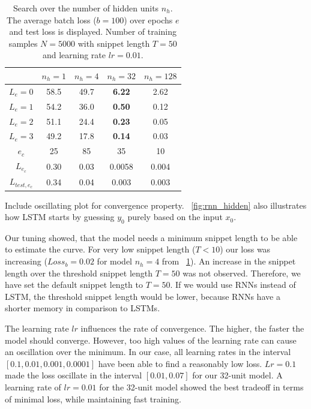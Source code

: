 \begin{table}[]
\centering
\begin{tabular}{ c| c| c| c| c}
& $n_h=1$ & $n_h=4$ &$n_h=32$ & $n_h=128$\\
\hline
$L_e=0$ & 58.5 & 49.7  & \textbf{6.22} & 2.62      \\
$L_e=1$ & 54.2 & 36.0  & \textbf{0.50} & 0.12      \\
$L_e=2$ & 51.1 & 24.4  & \textbf{0.23} & 0.05      \\
$L_e=3$ & 49.2 & 17.8  & \textbf{0.14} & 0.03      \\
\hline
$e_c$ 			& 25 	& 85 	& 35	& 10 		\\
$L_{e_c}$		&  0.30	& 0.03	& 0.0058& 0.004 	\\
$L_{test, e_c}$	& 0.34	& 0.04	&0.003	& 0.003 	\\     
\end{tabular}
\caption{Search over the number of hidden units $n_h$. The average batch loss ($b=100$) over epochs $e$ and test loss is displayed. Number of training samples $N = 5000$ with snippet length $T=50$ and learning rate $lr=0.01$.}
\label{tab:rnn_hidden}
\end{table}

Include oscillating plot for convergence property.
~\cref{fig:rnn_hidden} also illustrates how LSTM starts by guessing $y_0$ purely based on the input $x_0$. 

Our tuning showed, that the model needs a minimum snippet length to be able to estimate the curve. For very low snippet length ($T<10$) our loss was increasing ($Loss_b=0.02$ for model $n_h=4$ from ~\cref{tab:rnn_hidden}). An increase in the snippet length over the threshold snippet length $T=50$ was not observed. Therefore, we have set the default snippet length to $T=50$. If we would use RNNs instead of LSTM, the threshold snippet length would be lower, because RNNs have a shorter memory in comparison to LSTMs.

The learning rate $lr$ influences the rate of convergence. The higher, the faster the model should converge. However, too high values of the learning rate can cause an oscillation over the minimum. In our case, all learning rates in the interval $[0.1, 0.01, 0.001, 0.0001]$ have been able to find a reasonably low loss. $Lr=0.1$ made the loss oscillate in the interval $[0.01, 0.07]$ for our 32-unit model. A learning rate of $lr=0.01$ for the 32-unit model showed the best tradeoff in terms of minimal loss, while maintaining fast training.

